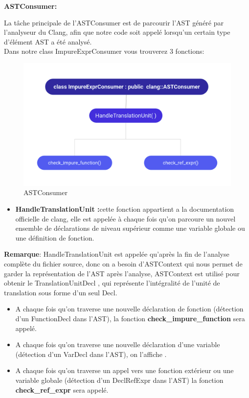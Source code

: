 \documentclass[12pt,a4paper]{article}
\begin{document}
\textbf{ASTConsumer:} 

La tâche principale de l’ASTConsumer est de parcourir  l'AST généré par l'analyseur du Clang, afin que notre code soit appelé lorsqu'un certain type d'élément AST a été analysé.\\
Dans notre class ImpureExprConsumer vous trouverez 3 fonctions:
\begin{figure}[H]
\centering
\includegraphics[scale=0.75]{cons-3.png} 
\caption[ASTConsumer]{ASTConsumer} 
\end{figure}

\begin{itemize}
    \item \textbf{HandleTranslationUnit :}cette fonction appartient a la documentation officielle de clang, elle est appelée à chaque fois qu’on parcoure un nouvel ensemble de déclarations de niveau supérieur comme une variable globale ou une  définition de fonction.
\end{itemize}

\textbf{Remarque}: HandleTranslationUnit est appelée qu'après la fin de l’analyse complète du fichier source, donc on a besoin d’ASTContext qui nous permet de garder la représentation de l’AST après l’analyse, ASTContext  est utilisé pour obtenir le TranslationUnitDecl , qui représente l'intégralité de l'unité de translation sous forme d’un seul Decl. \\

\begin{itemize}
\item A chaque fois qu’on traverse une nouvelle déclaration de fonction (détection d’un FunctionDecl dans l’AST), la fonction \textbf{check\_impure\_function}  sera appelé.
\item A chaque fois qu’on traverse une nouvelle déclaration d’une variable (détection d’un VarDecl dans l’AST), on l’affiche .
 \item A chaque fois qu’on traverse un appel vers une fonction extérieur ou une variable globale (détection d’un DeclRefExpr dans l’AST) la fonction \textbf{ check\_ref\_expr} sera appelé.
 \end{itemize}
\end{document}
